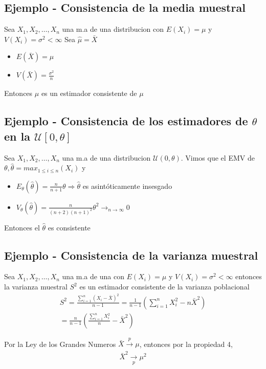 \documentclass[a4paper]{article}
\begin{document}
\subsection{Ejemplo - Consistencia de la media muestral}
Sea $X_{1},X_{2},\dots,X_{n}$ una m.a de una distribucion con $E(X_{i})=\mu$ y $V(X_{i}) = \sigma^2 < \infty$ 
Sea $\widehat{\mu} = \bar{X}$
\begin{itemize}
    \item $E(\bar{X}) = \mu$
    \item $V(\bar{X}) = \frac{\sigma^2}{n}$
\end{itemize}
Entonces $\widehat{\mu}$ es un estimador consistente de $\mu$

\subsection{Ejemplo - Consistencia de los estimadores de $\theta$ en la $\mathcal{U}[0,\theta]$}
Sea $X_{1},X_{2},\dots,X_{n}$ una m.a de una distribucion $\mathcal{U}(0, \theta)$. Vimos que el EMV de $\theta, \widehat{\theta} = max_{1\leq i \leq n}(X_{i})$ y 
\begin{itemize}
    \item $E_{\theta}(\widehat{\theta}) = \frac{n}{n+1}\theta \Rightarrow \widehat{\theta}$ es asintóticamente insesgado
    \item $V_{\theta}(\widehat{\theta}) = \frac{n}{(n+2)(n+1)^2}\theta^2 \rightarrow_{n\rightarrow\infty}0$
\end{itemize}
Entonces el $\widehat{\theta}$ es consistente

\subsection{Ejemplo - Consistencia de la varianza muestral}
Sea $X_{1},X_{2},\dots,X_{n}$ una m.a de una con $E(X_{i}) = \mu$ y $V(X_{i}) = \sigma^2 < \infty$ entonces la varianza muestral $S^2$ es un estimador
consistente de la varianza poblacional
\begin{gather*}
    S^2 = \frac{\sum_{i=1}^n (X_{i} - \bar{X})^2}{n-1} = \frac{1}{n-1}(\sum_{i=1}^n X_{i}^2 - n\bar{X}^2)
    \\
    = \frac{n}{n-1}(\frac{\sum_{i=1}^n X_{i}^2}{n} - \bar{X}^2)
\end{gather*}

Por la Ley de los Grandes Numeros $\bar{X} \xrightarrow[]{p} \mu$, entonces por la propiedad 4,
\begin{equation*}
    \bar{X}^2 \xrightarrow[p]{} \mu^2
\end{equation*}
\end{document}
